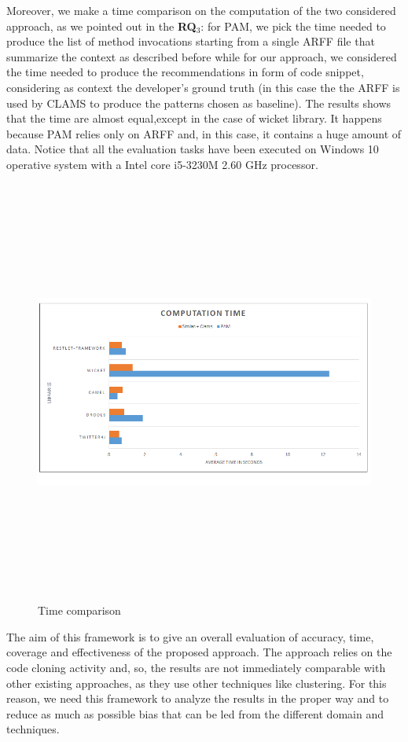 Moreover, we make a time comparison on the computation of the two considered approach, as we pointed out in the \textbf{RQ$_3$}: for PAM, we pick the time needed to produce the list of method invocations starting from a single ARFF file that summarize the context as described before while for our approach, we considered the time needed to produce the recommendations in form of code snippet, considering as context the developer's ground truth (in this case the the ARFF is used by CLAMS to produce the patterns chosen as baseline). The results shows that the time are almost equal,except in the case of wicket library. It happens because PAM relies only on ARFF and, in this case, it contains a huge amount of data. Notice that all the evaluation tasks have been executed on Windows 10 operative system with a Intel core i5-3230M 2.60 GHz processor.

\begin{figure}[H]
\includegraphics[width=14cm,height=14cm,keepaspectratio]{images/time.png}
\centering
\caption{Time comparison}
\label{fig:cmd}
\end{figure}

The aim of this framework is to give an overall evaluation of accuracy, time, coverage and effectiveness of the proposed approach. The approach relies on the code cloning activity and, so, the results are not immediately comparable with other existing approaches, as they use other techniques like clustering. For this reason, we need this framework to analyze the results in the proper way and to reduce as much as possible bias that can be led from the different domain and techniques. 

